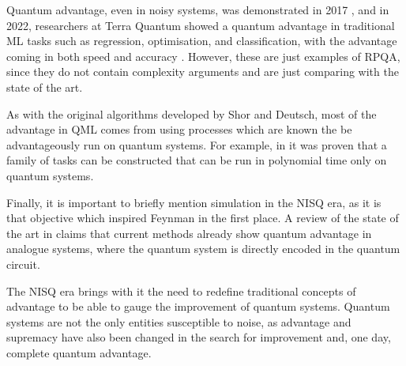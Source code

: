 Quantum advantage, even in noisy systems, was demonstrated in 2017 \cite{riste_demonstration_2017}, and in 2022, researchers at Terra Quantum showed a quantum advantage in traditional ML tasks such as regression, optimisation, and classification, with the advantage coming in both speed and accuracy \cite{perelshtein_practical_2022}. However, these are just examples of RPQA, since they do not contain complexity arguments and are just comparing with the state of the art.

As with the original algorithms developed by Shor and Deutsch, most of the advantage in QML comes from using processes which are known the be advantageously run on quantum systems. For example, in \cite{yamasaki_advantage_2023} it was proven that a family of tasks can be constructed that can be run in polynomial time only on quantum systems.

Finally, it is important to briefly mention simulation in the NISQ era, as it is that objective which inspired Feynman in the first place. A review of the state of the art in \cite{daley_practical_2022} claims that current methods already show quantum advantage in analogue systems, where the quantum system is directly encoded in the quantum circuit.


The NISQ era brings with it the need to redefine traditional concepts of advantage to be able to gauge the improvement of quantum systems. Quantum systems are not the only entities susceptible to noise, as advantage and supremacy have also been changed in the search for improvement and, one day, complete quantum advantage.


